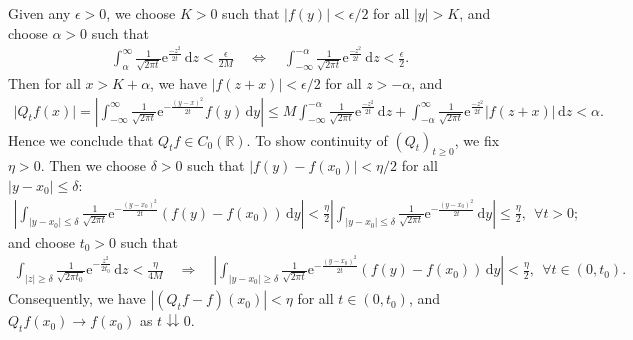 \documentclass{article}
\numberwithin{equation}{section}
\newcommand{\e}{\mathrm{e}}
\renewcommand{\d}{\mathrm{d}}
\theoremstyle{plain}
\theoremstyle{definition}
\begin{document}
Given any $\epsilon>0$, we choose $K>0$ such that $\vert f(y)\vert<\epsilon/2$ for all $\vert y\vert>K$, and choose $\alpha>0$ such that
\begin{align*}
	\int_\alpha^{\infty}\frac{1}{\sqrt{2\pi t}}\e^{\frac{-z^2}{2t}}\,\d z<\frac{\epsilon}{2M}\quad\Leftrightarrow\quad \int_{-\infty}^{-\alpha}\frac{1}{\sqrt{2\pi t}}\e^{\frac{-z^2}{2t}}\,\d z<\frac{\epsilon}{2}.
\end{align*}
Then for all $x>K+\alpha$, we have $\vert f(z+x)\vert<\epsilon/2$ for all $z>-\alpha$, and
\begin{align*}
	\vert Q_tf(x)\vert = \left\vert\int_{-\infty}^\infty\frac{1}{\sqrt{2\pi t}}\e^{-\frac{(y-x)^2}{2t}}f(y)\,\d y\right\vert\leq M\int_{-\infty}^{-\alpha}\frac{1}{\sqrt{2\pi t}}\e^{\frac{-z^2}{2t}}\,\d z + \int_{-\alpha}^\infty\frac{1}{\sqrt{2\pi t}}\e^{\frac{-z^2}{2t}}\vert f(z+x)\vert\,\d z<\alpha.
\end{align*}
Hence we conclude that $Q_tf\in C_0(\mathbb{R})$. To show continuity of $(Q_t)_{t\geq 0}$, we fix $\eta>0$. Then we choose $\delta>0$ such that $\vert f(y)-f(x_0)\vert<\eta/2$ for all $\vert y-x_0\vert\leq\delta$:
\begin{align*}
	\left\vert\int_{\vert y-x_0\vert\leq\delta}\frac{1}{\sqrt{2\pi t}}\e^{-\frac{(y-x_0)^2}{2t}}(f(y)-f(x_0))\,\d y\right\vert<\frac{\eta}{2}\left\vert\int_{\vert y-x_0\vert\leq\delta}\frac{1}{\sqrt{2\pi t}}\e^{-\frac{(y-x_0)^2}{2t}}\,\d y\right\vert\leq\frac{\eta}{2},\ \ \forall t>0;
\end{align*}
and choose $t_0>0$ such that
\begin{align*}
	\int_{\vert z\vert\geq\delta}\frac{1}{\sqrt{2\pi t_0}}\e^{-\frac{z^2}{2t_0}}\,\d z < \frac{\eta}{4M}\quad\Rightarrow\quad \left\vert\int_{\vert y-x_0\vert\geq\delta}\frac{1}{\sqrt{2\pi t}}\e^{-\frac{(y-x_0)^2}{2t}}(f(y)-f(x_0))\,\d y\right\vert<\frac{\eta}{2},\ \ \forall t\in(0,t_0).
\end{align*}
Consequently, we have $\left\vert(Q_t f- f)(x_0)\right\vert<\eta$ for all $t\in(0,t_0)$, and $Q_tf(x_0)\to f(x_0)$ as $t\downdownarrows 0$.
\end{document}
